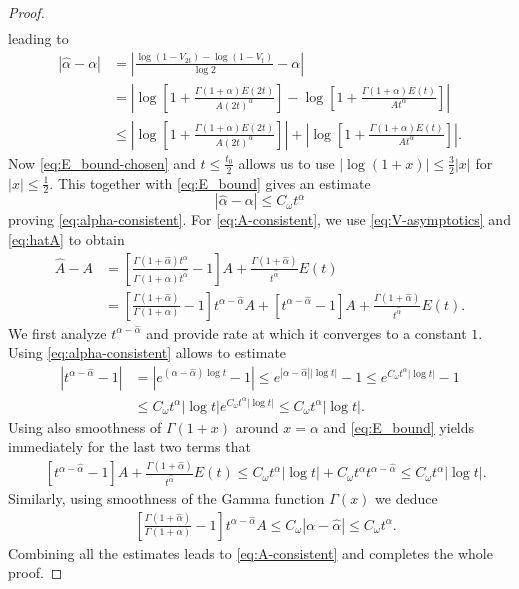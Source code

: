 \documentclass[11pt,reqno,oneside, a4paper]{amsart}
\numberwithin{equation}{section}
\theoremstyle{remark}
\begin{document}
\begin{proof}
\begin{align*}
\end{align*}
leading to
\begin{align*}
    |\hat\alpha - \alpha| &= \left|\frac{\log(1-V_{2t}) - \log(1-V_t)}{\log 2} - \alpha\right| \\
    &=\left|\log\left[1+\frac{\Gamma(1+\alpha)E(2t)}{A(2t)^\alpha}\right] - \log\left[1+\frac{\Gamma(1+\alpha)E(t)}{At^\alpha}\right]\right|\\
    &\leq \left|\log\left[1+\frac{\Gamma(1+\alpha)E(2t)}{A(2t)^\alpha}\right]\right| + \left|\log\left[1+\frac{\Gamma(1+\alpha)E(t)}{At^\alpha}\right]\right|.
\end{align*}
Now \eqref{eq:E_bound-chosen} and $t\leq \frac{t_0}{2}$ allows us to use $|\log(1+x)|\leq \frac32|x|$ for $|x|\leq \frac12$. This together with \eqref{eq:E_bound} gives an estimate
$$
|\hat\alpha - \alpha| \leq C_\omega t^{\alpha}
$$
proving \eqref{eq:alpha-consistent}. For \eqref{eq:A-consistent}, we use \eqref{eq:V-asymptotics} and \eqref{eq:hatA} to obtain
\begin{align*}
    \hat{A} - A &= \left[\frac{\Gamma(1+\hat\alpha)t^\alpha}{\Gamma(1+\alpha)t^{\hat\alpha}} - 1\right]A + \frac{\Gamma(1+\hat\alpha)}{t^{\hat\alpha}}E(t)\\
    &= \left[\frac{\Gamma(1+\hat\alpha)}{\Gamma(1+\alpha)} - 1\right]t^{\alpha-\hat\alpha}A + \left[t^{\alpha-\hat\alpha} - 1\right]A + \frac{\Gamma(1+\hat\alpha)}{t^{\hat\alpha}}E(t).
\end{align*}
We first analyze $t^{\alpha-\hat\alpha}$ and provide rate at which it converges to a constant $1$. Using \eqref{eq:alpha-consistent} allows to estimate 
\begin{align*}
   \left| t^{\alpha-\hat\alpha} - 1\right| &= \left|e^{(\alpha-\hat\alpha) \log t}-1\right| \leq e^{|\alpha-\hat\alpha||\log t|} - 1 \leq e^{C_\omega t^\alpha |\log t|} - 1 \\
   &\leq C_\omega t^\alpha |\log t|e^{C_\omega t^\alpha |\log t|}\leq C_\omega t^\alpha |\log t|.
\end{align*}
Using also smoothness of $\Gamma(1+x)$ around $x=\alpha$ and \eqref{eq:E_bound} yields immediately for the last two terms that 
\begin{align*}
    &\left[t^{\alpha-\hat\alpha} - 1\right]A + \frac{\Gamma(1+\hat\alpha)}{t^{\hat\alpha}}E(t)  \leq C_\omega t^\alpha |\log t| + C_\omega t^{\alpha}t^{\alpha-\hat\alpha}\leq C_\omega t^\alpha |\log t|.
\end{align*}
Similarly, using smoothness of the Gamma function $\Gamma(x)$ we deduce 
\begin{align*}
    &\left[\frac{\Gamma(1+\hat\alpha)}{\Gamma(1+\alpha)} - 1\right]t^{\alpha-\hat\alpha}A\leq C_\omega |\alpha - \hat\alpha|\leq C_\omega t^\alpha.
\end{align*}
Combining all the estimates leads to \eqref{eq:A-consistent} and completes the whole proof.
\end{proof}
\end{document}
